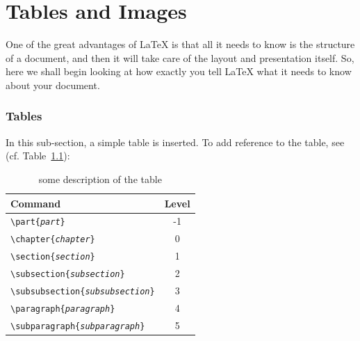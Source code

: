 	\chapter{Tables and Images}
	One of the great advantages of \LaTeX{} is that all it needs to know is
	the structure of a document, and then it will take care of the layout
	and presentation itself.  So, here we shall begin looking at how exactly
	you tell \LaTeX{} what it needs to know about your document.
	
	\subsection{Tables}
	In this sub-section, a simple table is inserted. To add reference to the table, see (cf. Table~\hyperref[tab:table example]{\ref{tab:table example}}):
	
	\begin{table}[htb]
		\centering
		\begin{tabular}{|p{}|c|}
			
			\hline  %
			Command & Level \\ \hline  %
			\texttt{\textbackslash part\{\emph{part}\}} & -1 \\
			\texttt{\textbackslash chapter\{\emph{chapter}\}} & 0 \\
			\texttt{\textbackslash section\{\emph{section}\}} & 1 \\
			\texttt{\textbackslash subsection\{\emph{subsection}\}} & 2 \\
			\texttt{\textbackslash subsubsection\{\emph{subsubsection}\}} & 3 \\
			\texttt{\textbackslash paragraph\{\emph{paragraph}\}} & 4 \\
			\texttt{\textbackslash subparagraph\{\emph{subparagraph}\}} & 5 \\
			\hline
			
		\end{tabular}
		\caption{some description of the table}
		\label{tab:table example}
	\end{table}
	
